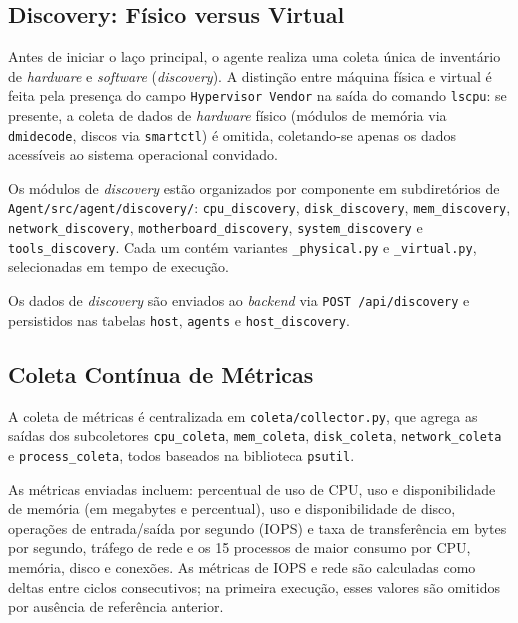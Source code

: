 \documentclass[
    12pt
    ,oneside
    ,a4paper
    ,chapter=TITLE
    ,section=TITLE
    ,sumario=abnt-6027-2012]{abntex2}
\begin{document}
\begin{figure}[H]
\end{figure}

\subsection{Discovery: Físico versus Virtual}
\label{subsec:discovery}

Antes de iniciar o laço principal, o agente realiza uma coleta única de inventário de
\textit{hardware} e \textit{software} (\textit{discovery}). A distinção entre máquina
física e virtual é feita pela presença do campo \texttt{Hypervisor Vendor} na saída do
comando \texttt{lscpu}: se presente, a coleta de dados de \textit{hardware} físico
(módulos de memória via \texttt{dmidecode}, discos via \texttt{smartctl}) é omitida,
coletando-se apenas os dados acessíveis ao sistema operacional convidado.

Os módulos de \textit{discovery} estão organizados por componente em subdiretórios de
\texttt{Agent/src/agent/discovery/}: \texttt{cpu\_discovery}, \texttt{disk\_discovery},
\texttt{mem\_discovery}, \texttt{network\_discovery}, \texttt{motherboard\_discovery},
\texttt{system\_discovery} e \texttt{tools\_discovery}. Cada um contém variantes
\texttt{\_physical.py} e \texttt{\_virtual.py}, selecionadas em tempo de execução.

Os dados de \textit{discovery} são enviados ao \textit{backend} via
\texttt{POST /api/discovery} e persistidos nas tabelas \texttt{host}, \texttt{agents}
e \texttt{host\_discovery}.

\subsection{Coleta Contínua de Métricas}
\label{subsec:metricas-agente}

A coleta de métricas é centralizada em \texttt{coleta/collector.py}, que agrega as
saídas dos subcoletores \texttt{cpu\_coleta}, \texttt{mem\_coleta},
\texttt{disk\_coleta}, \texttt{network\_coleta} e \texttt{process\_coleta}, todos
baseados na biblioteca \texttt{psutil}.

As métricas enviadas incluem: percentual de uso de CPU, uso e disponibilidade de
memória (em megabytes e percentual), uso e disponibilidade de disco, operações de
entrada/saída por segundo (IOPS) e taxa de transferência em bytes por segundo,
tráfego de rede e os 15 processos de maior consumo por CPU, memória, disco e
conexões. As métricas de IOPS e rede são calculadas como deltas entre ciclos
consecutivos; na primeira execução, esses valores são omitidos por ausência de
referência anterior.
\end{document}
